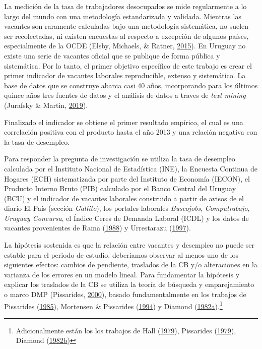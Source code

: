\documentclass[12pt,oneside]{reedthesis}
\begin{document}
La medición de la tasa de trabajadores desocupados se mide regularmente a lo largo del mundo con una metodología estandarizada y validada. Mientras las vacantes son raramente calculadas bajo una metodología sistemática, no suelen ser recolectadas, ni existen encuestas al respecto a excepción de algunos países, especialmente de la OCDE (Elsby, Michaels, \& Ratner, \protect\hyperlink{ref-Elsby2015}{2015}). En Uruguay no existe una serie de vacantes oficial que se publique de forma pública y sistemática. Por lo tanto, el primer objetivo específico de este trabajo es crear el primer indicador de vacantes laborales reproducible, extenso y sistemático. La base de datos que se construye abarca casi 40 años, incorporando para los últimos quince años tres fuentes de datos y el análisis de datos a traves de \emph{text mining} (Jurafsky \& Martin, \protect\hyperlink{ref-Jurasky2019}{2019}).

Finalizado el indicador se obtiene el primer resultado empírico, el cual es una correlación positiva con el producto hasta el año 2013 y una relación negativa con la tasa de desempleo.

Para responder la pregunta de investigación se utiliza la tasa de desempleo calculada por el Instituto Nacional de Estadística (INE), la Encuesta Continua de Hogares (ECH) sistematizada por parte del Instituto de Economía (IECON), el Producto Interno Bruto (PIB) calculado por el Banco Central del Uruguay (BCU) y el indicador de vacantes laborales construido a partir de avisos de el diario El País (sección \emph{Gallito}), los portales laborales \emph{Buscojobs}, \emph{Computrabajo}, \emph{Uruguay Concursa}, el Índice Ceres de Demanda Laboral (ICDL) y los datos de vacantes provenientes de Rama (\protect\hyperlink{ref-Rama1988}{1988}) y Urrestarazu (\protect\hyperlink{ref-Urrestarazu1997}{1997}).

La hipótesis sostenida es que la relación entre vacantes y desempleo no puede ser estable para el periodo de estudio, deberíamos observar al menos uno de los siguientes efectos: cambios de pendiente, traslados de la CB y/o alteraciones en la varianza de los errores en un modelo lineal. Para fundamentar la hipótesis y explicar los traslados de la CB se utiliza la teoría de búsqueda y emparejamiento o marco DMP (Pissarides, \protect\hyperlink{ref-Pissarides2000}{2000}), basado fundamentalmente en los trabajos de Pissarides (\protect\hyperlink{ref-Pissarides1985}{1985}), Mortensen \& Pissarides (\protect\hyperlink{ref-Mortensen1994}{1994}) y Diamond (\protect\hyperlink{ref-Diamond1982}{1982}\protect\hyperlink{ref-Diamond1982}{a}).\footnote{Adicionalmente están los los trabajos de Hall (\protect\hyperlink{ref-Hall1979}{1979}), Pissarides (\protect\hyperlink{ref-Pissarides1979}{1979}), Diamond (\protect\hyperlink{ref-Diamond1982B}{1982}\protect\hyperlink{ref-Diamond1982B}{b})}
\end{document}
